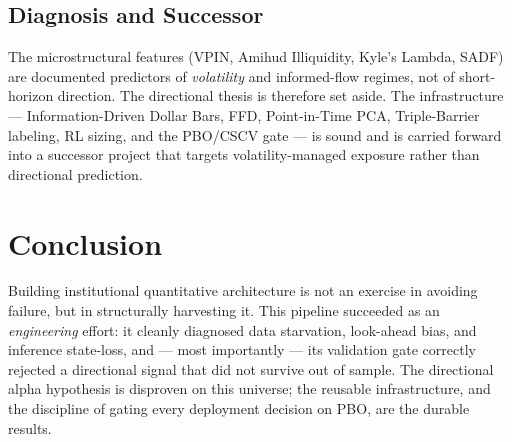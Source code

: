 \documentclass[12pt, a4paper]{article}
\begin{document}
\subsection{Diagnosis and Successor}
The microstructural features (VPIN, Amihud Illiquidity, Kyle's Lambda, SADF) are documented predictors of \emph{volatility} and informed-flow regimes, not of short-horizon direction. The directional thesis is therefore set aside. The infrastructure --- Information-Driven Dollar Bars, FFD, Point-in-Time PCA, Triple-Barrier labeling, RL sizing, and the PBO/CSCV gate --- is sound and is carried forward into a successor project that targets volatility-managed exposure rather than directional prediction.

\section{Conclusion}
Building institutional quantitative architecture is not an exercise in avoiding failure, but in structurally harvesting it. This pipeline succeeded as an \emph{engineering} effort: it cleanly diagnosed data starvation, look-ahead bias, and inference state-loss, and --- most importantly --- its validation gate correctly rejected a directional signal that did not survive out of sample. The directional alpha hypothesis is disproven on this universe; the reusable infrastructure, and the discipline of gating every deployment decision on PBO, are the durable results.
\end{document}

